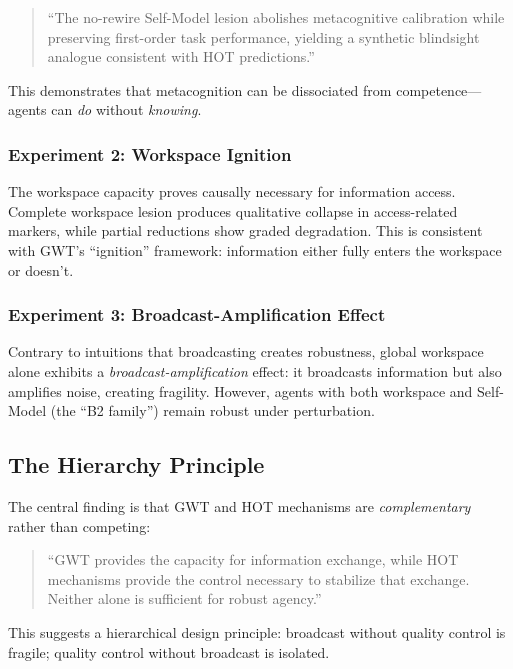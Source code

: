 \begin{quote}
``The no-rewire Self-Model lesion abolishes metacognitive calibration while preserving first-order task performance, yielding a synthetic blindsight analogue consistent with HOT predictions.''~\citep[p.~1]{phua2025}
\end{quote}

This demonstrates that metacognition can be dissociated from competence---agents can \emph{do} without \emph{knowing}.

\subsubsection{Experiment 2: Workspace Ignition}

The workspace capacity proves causally necessary for information access. Complete workspace lesion produces qualitative collapse in access-related markers, while partial reductions show graded degradation. This is consistent with GWT's ``ignition'' framework: information either fully enters the workspace or doesn't.

\subsubsection{Experiment 3: Broadcast-Amplification Effect}

Contrary to intuitions that broadcasting creates robustness, global workspace alone exhibits a \emph{broadcast-amplification} effect: it broadcasts information but also amplifies noise, creating fragility. However, agents with both workspace and Self-Model (the ``B2 family'') remain robust under perturbation.

\subsection{The Hierarchy Principle}

The central finding is that GWT and HOT mechanisms are \emph{complementary} rather than competing:

\begin{quote}
``GWT provides the capacity for information exchange, while HOT mechanisms provide the control necessary to stabilize that exchange. Neither alone is sufficient for robust agency.''~\citep[p.~2]{phua2025}
\end{quote}

This suggests a hierarchical design principle: broadcast without quality control is fragile; quality control without broadcast is isolated.

